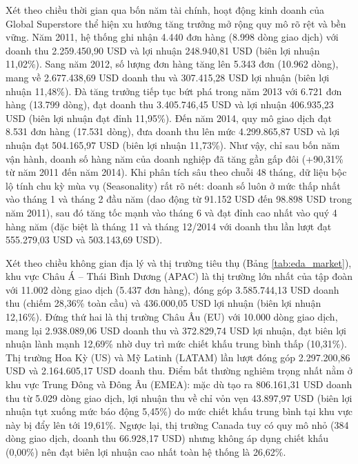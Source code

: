 Xét theo chiều thời gian qua bốn năm tài chính, hoạt động kinh doanh của Global Superstore thể hiện xu hướng tăng trưởng mở rộng quy mô rõ rệt và bền vững. Năm 2011, hệ thống ghi nhận 4.440 đơn hàng (8.998 dòng giao dịch) với doanh thu 2.259.450,90 USD và lợi nhuận 248.940,81 USD (biên lợi nhuận 11,02\%). Sang năm 2012, số lượng đơn hàng tăng lên 5.343 đơn (10.962 dòng), mang về 2.677.438,69 USD doanh thu và 307.415,28 USD lợi nhuận (biên lợi nhuận 11,48\%). Đà tăng trưởng tiếp tục bứt phá trong năm 2013 với 6.721 đơn hàng (13.799 dòng), đạt doanh thu 3.405.746,45 USD và lợi nhuận 406.935,23 USD (biên lợi nhuận đạt đỉnh 11,95\%). Đến năm 2014, quy mô giao dịch đạt 8.531 đơn hàng (17.531 dòng), đưa doanh thu lên mức 4.299.865,87 USD và lợi nhuận đạt 504.165,97 USD (biên lợi nhuận 11,73\%). Như vậy, chỉ sau bốn năm vận hành, doanh số hàng năm của doanh nghiệp đã tăng gần gấp đôi (+90,31\% từ năm 2011 đến năm 2014). Khi phân tích sâu theo chuỗi 48 tháng, dữ liệu bộc lộ tính chu kỳ mùa vụ (Seasonality) rất rõ nét: doanh số luôn ở mức thấp nhất vào tháng 1 và tháng 2 đầu năm (dao động từ 91.152 USD đến 98.898 USD trong năm 2011), sau đó tăng tốc mạnh vào tháng 6 và đạt đỉnh cao nhất vào quý 4 hàng năm (đặc biệt là tháng 11 và tháng 12/2014 với doanh thu lần lượt đạt 555.279,03 USD và 503.143,69 USD).

Xét theo chiều không gian địa lý và thị trường tiêu thụ (Bảng \ref{tab:eda_market}), khu vực Châu Á -- Thái Bình Dương (APAC) là thị trường lớn nhất của tập đoàn với 11.002 dòng giao dịch (5.437 đơn hàng), đóng góp 3.585.744,13 USD doanh thu (chiếm 28,36\% toàn cầu) và 436.000,05 USD lợi nhuận (biên lợi nhuận 12,16\%). Đứng thứ hai là thị trường Châu Âu (EU) với 10.000 dòng giao dịch, mang lại 2.938.089,06 USD doanh thu và 372.829,74 USD lợi nhuận, đạt biên lợi nhuận lành mạnh 12,69\% nhờ duy trì mức chiết khấu trung bình thấp (10,31\%). Thị trường Hoa Kỳ (US) và Mỹ Latinh (LATAM) lần lượt đóng góp 2.297.200,86 USD và 2.164.605,17 USD doanh thu. Điểm bất thường nghiêm trọng nhất nằm ở khu vực Trung Đông và Đông Âu (EMEA): mặc dù tạo ra 806.161,31 USD doanh thu từ 5.029 dòng giao dịch, lợi nhuận thu về chỉ vỏn vẹn 43.897,97 USD (biên lợi nhuận tụt xuống mức báo động 5,45\%) do mức chiết khấu trung bình tại khu vực này bị đẩy lên tới 19,61\%. Ngược lại, thị trường Canada tuy có quy mô nhỏ (384 dòng giao dịch, doanh thu 66.928,17 USD) nhưng không áp dụng chiết khấu (0,00\%) nên đạt biên lợi nhuận cao nhất toàn hệ thống là 26,62\%.

